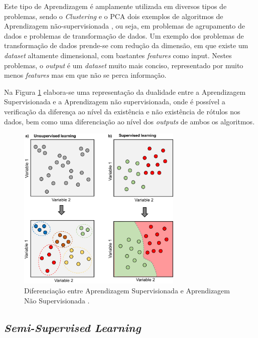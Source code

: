 \documentclass[12pt,a4paper,twoside]{report}
\begin{document}
{Este tipo de Aprendizagem é amplamente utilizada em diversos tipos de problemas, sendo o \textit{Clustering} e o \gls{PCA} dois exemplos de algoritmos de Aprendizagem não-supervisionada \cite{10.1007/s42979-021-00592-x}, ou seja, em problemas de agrupamento de dados e problemas de transformação de dados. Um exemplo dos problemas de transformação de dados prende-se com redução da dimensão, em que existe um \textit{dataset} altamente dimensional, com bastantes \textit{features} como input. Nestes problemas, o \textit{output} é um \textit{dataset} muito mais conciso, representado por muito menos \textit{features} mas em que não se perca informação.

Na Figura \ref{fig:supuns} elabora-se uma representação da dualidade entre a Aprendizagem Supervisionada e a Aprendizagem não supervisionada, onde é possível a verificação da diferença ao nível da existência e não existência de rótulos nos dados, bem como uma diferenciação ao nível dos \textit{outputs} de ambos os algoritmos.

\begin{figure}[H]
    \centering
    \includegraphics[width=0.7\textwidth]{imagens/Supervised-and-unsupervised-machine-learning-a-Schematic-representation-of-an.png}
    \caption{Diferenciação entre Aprendizagem Supervisionada e Aprendizagem Não Supervisionada \cite{unsupervisedimage}.}
    \label{fig:supuns}
\end{figure}

\subsection{\textit{Semi-Supervised Learning}}

}
\end{document}
